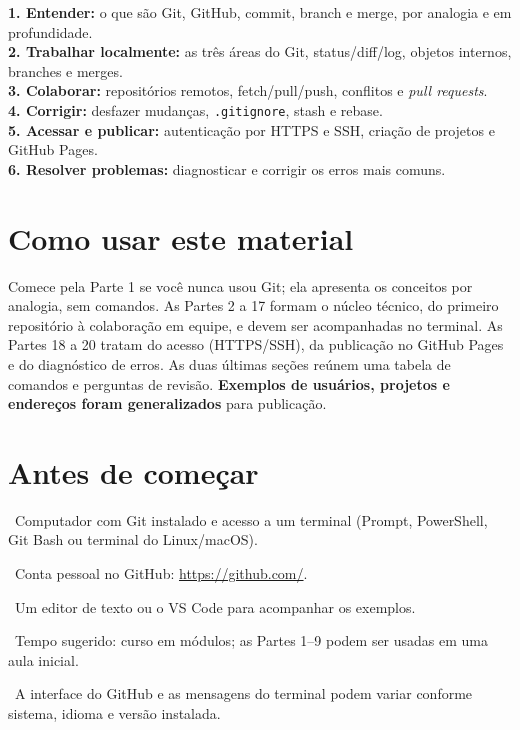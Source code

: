 \documentclass[11pt,a4paper]{article}
\begin{document}
\begin{tcolorbox}[title={MAPA DA APOSTILA --- DO CONCEITO À PRÁTICA}]
\textbf{1. Entender:} o que são Git, GitHub, commit, branch e merge, por analogia e em profundidade.\\
\textbf{2. Trabalhar localmente:} as três áreas do Git, status/diff/log, objetos internos, branches e merges.\\
\textbf{3. Colaborar:} repositórios remotos, fetch/pull/push, conflitos e \textit{pull requests}.\\
\textbf{4. Corrigir:} desfazer mudanças, \texttt{.gitignore}, stash e rebase.\\
\textbf{5. Acessar e publicar:} autenticação por HTTPS e SSH, criação de projetos e GitHub Pages.\\
\textbf{6. Resolver problemas:} diagnosticar e corrigir os erros mais comuns.
\end{tcolorbox}

\section*{Como usar este material}
Comece pela Parte 1 se você nunca usou Git; ela apresenta os conceitos por analogia, sem comandos. As Partes 2 a 17 formam o núcleo técnico, do primeiro repositório à colaboração em equipe, e devem ser acompanhadas no terminal. As Partes 18 a 20 tratam do acesso (HTTPS/SSH), da publicação no GitHub Pages e do diagnóstico de erros. As duas últimas seções reúnem uma tabela de comandos e perguntas de revisão. \textbf{Exemplos de usuários, projetos e endereços foram generalizados} para publicação.

\section*{Antes de começar}
\textbullet\ Computador com Git instalado e acesso a um terminal (Prompt, PowerShell, Git Bash ou terminal do Linux/macOS).\par
\textbullet\ Conta pessoal no GitHub: \url{https://github.com/}.\par
\textbullet\ Um editor de texto ou o VS Code para acompanhar os exemplos.\par
\textbullet\ Tempo sugerido: curso em módulos; as Partes 1--9 podem ser usadas em uma aula inicial.\par
\textbullet\ A interface do GitHub e as mensagens do terminal podem variar conforme sistema, idioma e versão instalada.\par
\end{document}
